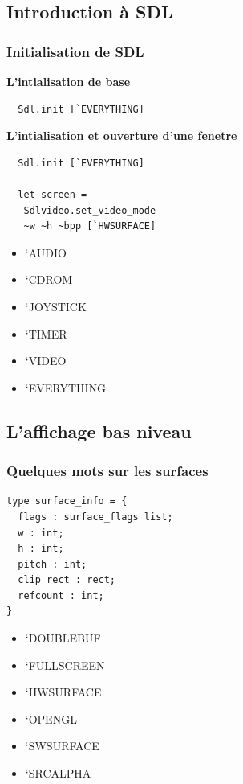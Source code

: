 \subsection{Introduction à SDL} %

\begin{frame}[fragile]
	\frametitle{Initialisation de SDL}
	\begin{minipage}{0.55\textwidth}
		\textbf{L'intialisation de base}
		\lstset{basicstyle=\small}
		\begin{lstlisting}
  Sdl.init [`EVERYTHING] 
		\end{lstlisting}
		\textbf{L'intialisation et ouverture d'une fenetre}
		\lstset{basicstyle=\small}
		\begin{lstlisting}
  Sdl.init [`EVERYTHING]

  let screen = 
   Sdlvideo.set_video_mode 
   ~w ~h ~bpp [`HWSURFACE]
		\end{lstlisting}
	\end{minipage}
	\begin{minipage}{0.4\textwidth}
		\begin{itemize}
			\item `AUDIO
			\item `CDROM
			\item `JOYSTICK
			\item `TIMER
			\item `VIDEO
		\end{itemize}
		\begin{itemize}
			\item `EVERYTHING
		\end{itemize}
	\end{minipage}
\end{frame}

\subsection{L'affichage bas niveau} %

\begin{frame}[fragile]
	\frametitle{Quelques mots sur les surfaces}
	\begin{minipage}{0.55\textwidth}
		\lstset{basicstyle=\small}
		\begin{lstlisting}
type surface_info = {
  flags : surface_flags list;
  w : int;
  h : int;
  pitch : int;
  clip_rect : rect;
  refcount : int;
}
		\end{lstlisting}
	\end{minipage}
	\begin{minipage}{0.4\textwidth}
		\begin{itemize}
			\item `DOUBLEBUF
			\item `FULLSCREEN
			\item `HWSURFACE
			\item `OPENGL
			\item `SWSURFACE
			\item `SRCALPHA
		\end{itemize}
	\end{minipage}
\end{frame}


